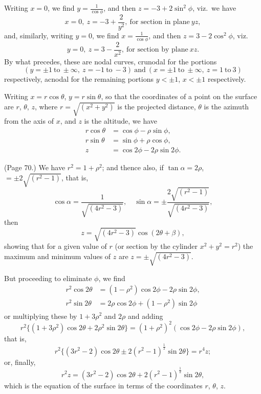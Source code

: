 \documentclass[11pt,a4paper]{article}
\begin{document}
Writing $x = 0$, we find $y = \frac{1}{\cos\phi}$, and then $z = -3 + 2\sin^2\phi$, viz.\ we have
\[
x = 0,\ z = -3 + \frac{2}{y^2},\ \text{for section in plane}\ yz,
\]
and, similarly, writing $y = 0$, we find $x = \frac{1}{\cos\phi}$, and then $z = 3 - 2\cos^2\phi$, viz.
\[
y = 0,\ z = 3 - \frac{2}{x^2},\ \text{for section by plane}\ xz.
\]
By what precedes, these are nodal curves, crunodal for the portions
\[
(y = \pm 1\ \text{to}\ \pm\infty,\ z = -1\ \text{to}\ -3)\ \text{and}\ (x = \pm 1\ \text{to}\ \pm\infty,\ z = 1\ \text{to}\ 3)
\]
respectively, acnodal for the remaining portions $y < \pm 1$, $x < \pm 1$ respectively.

Writing $x = r\cos\theta$, $y = r\sin\theta$, so that the coordinates of a point on the surface are $r$, $\theta$, $z$, where $r = \sqrt{(x^2 + y^2)}$ is the projected distance, $\theta$ is the azimuth from the axis of $x$, and $z$ is the altitude, we have
\begin{align*}
r\cos\theta &= \cos\phi - \rho\sin\phi, \\
r\sin\theta &= \sin\phi + \rho\cos\phi, \\
z &= \cos 2\phi - 2\rho\sin 2\phi.
\end{align*}

\bigskip

\noindent (Page 70.) We have $r^2 = 1 + \rho^2$; and thence also, if $\tan\alpha = 2\rho$, $= \pm 2\sqrt{(r^2 - 1)}$, that is,
\[
\cos\alpha = \frac{1}{\sqrt{(4r^2 - 3)}},\quad \sin\alpha = \pm \frac{2\sqrt{(r^2 - 1)}}{\sqrt{(4r^2 - 3)}},
\]
then
\[
z = \sqrt{(4r^2 - 3)} \cos(2\theta + \beta),
\]
showing that for a given value of $r$ (or section by the cylinder $x^2 + y^2 = r^2$) the maximum and minimum values of $z$ are $z = \pm\sqrt{(4r^2 - 3)}$.

But proceeding to eliminate $\phi$, we find
\begin{align*}
r^2 \cos 2\theta &= (1 - \rho^2)\cos 2\phi - 2\rho\sin 2\phi, \\
r^2 \sin 2\theta &= 2\rho\cos 2\phi + (1 - \rho^2)\sin 2\phi
\end{align*}
or multiplying these by $1 + 3\rho^2$ and $2\rho$ and adding
\[
r^2 \{(1 + 3\rho^2)\cos 2\theta + 2\rho^2 \sin 2\theta\} = (1 + \rho^2)^2 (\cos 2\phi - 2\rho\sin 2\phi),
\]
that is,
\[
r^2 \{(3r^2 - 2)\cos 2\theta \pm 2(r^2 - 1)^{\tfrac{1}{2}} \sin 2\theta\} = r^4 z;
\]
or, finally,
\[
r^2 z = (3r^2 - 2)\cos 2\theta + 2(r^2 - 1)^{\tfrac{1}{2}} \sin 2\theta,
\]
which is the equation of the surface in terms of the coordinates $r$, $\theta$, $z$.
\end{document}
